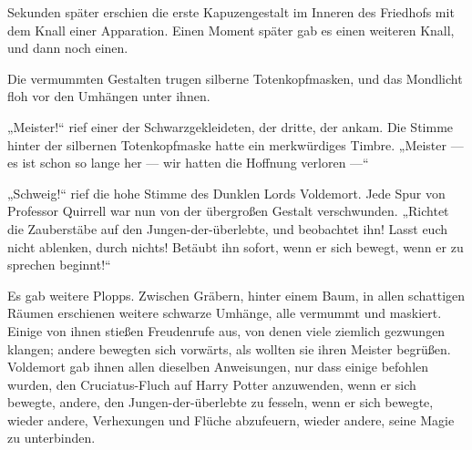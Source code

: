 Sekunden später erschien die erste Kapuzengestalt im Inneren des Friedhofs mit dem Knall einer Apparation. Einen Moment später gab es einen weiteren Knall, und dann noch einen.

Die vermummten Gestalten trugen silberne Totenkopfmasken, und das Mondlicht floh vor den Umhängen unter ihnen.

„Meister!“ rief einer der Schwarzgekleideten, der dritte, der ankam. Die Stimme hinter der silbernen Totenkopfmaske hatte ein merkwürdiges Timbre.
„Meister — es ist schon so lange her — wir hatten die Hoffnung verloren —“

„Schweig!“ rief die hohe Stimme des Dunklen Lords Voldemort.
Jede Spur von Professor Quirrell war nun von der übergroßen Gestalt verschwunden.
„Richtet die Zauberstäbe auf den Jungen-der-überlebte, und beobachtet ihn! Lasst euch nicht ablenken, durch nichts! Betäubt ihn sofort, wenn er sich bewegt, wenn er zu sprechen beginnt!“

Es gab weitere Plopps. Zwischen Gräbern, hinter einem Baum, in allen schattigen Räumen erschienen weitere schwarze Umhänge, alle vermummt und maskiert. Einige von ihnen stießen Freudenrufe aus, von denen viele ziemlich gezwungen klangen; andere bewegten sich vorwärts, als wollten sie ihren Meister begrüßen. Voldemort gab ihnen allen dieselben Anweisungen, nur dass einige befohlen wurden, den Cruciatus-Fluch auf Harry Potter anzuwenden, wenn er sich bewegte, andere, den Jungen-der-überlebte zu fesseln, wenn er sich bewegte, wieder andere, Verhexungen und Flüche abzufeuern, wieder andere, seine Magie zu unterbinden.

